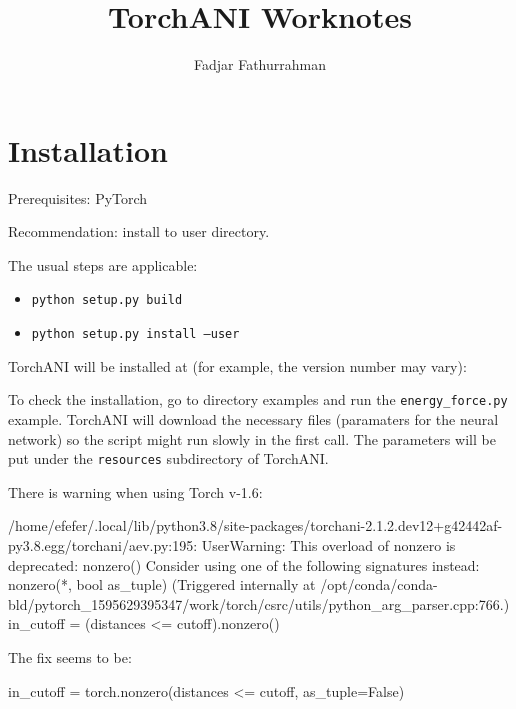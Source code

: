 \documentclass[a4paper,12pt]{article} %
\newcommand{\txtinline}[1]{\texttt{#1}}
\begin{document}
\title{TorchANI Worknotes}
\author{Fadjar Fathurrahman}
\date{}
\maketitle

\section{Installation}

Prerequisites: PyTorch

Recommendation: install to user directory.

The usual steps are applicable:
\begin{itemize}
\item \txtinline{python setup.py build}
\item \txtinline{python setup.py install --user}
\end{itemize}

TorchANI will be installed at (for example, the version number
may vary):

To check the installation, go to directory examples and run the
\txtinline{energy_force.py} example.
TorchANI will download the necessary files (paramaters for the neural network)
so the script might run slowly in the first call.
The parameters will be put under the \txtinline{resources} subdirectory of TorchANI.

There is warning when using Torch v-1.6:
\begin{textcode}
/home/efefer/.local/lib/python3.8/site-packages/torchani-2.1.2.dev12+g42442af-py3.8.egg/torchani/aev.py:195: UserWarning: This overload of nonzero is deprecated:
	nonzero()
Consider using one of the following signatures instead:
	nonzero(*, bool as_tuple) (Triggered internally at  /opt/conda/conda-bld/pytorch_1595629395347/work/torch/csrc/utils/python_arg_parser.cpp:766.)
in_cutoff = (distances <= cutoff).nonzero()
\end{textcode}

The fix seems to be:
\begin{pythoncode}
in_cutoff = torch.nonzero(distances <= cutoff, as_tuple=False)
\end{pythoncode}







\end{document}

